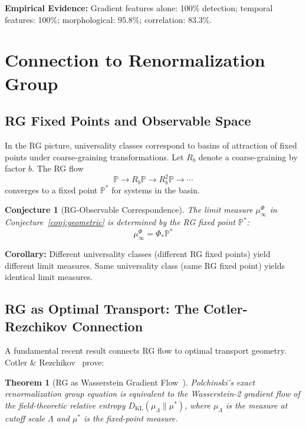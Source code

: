 \documentclass[aps,pre,reprint,amsmath,amssymb,superscriptaddress]{revtex4-2}
\newtheorem{conjecture}{Conjecture}
\newtheorem{theorem}{Theorem}
\newcommand{\bbP}{\mathbb{P}}
\begin{document}
\textbf{Empirical Evidence:} Gradient features alone: 100\% detection; temporal features: 100\%; morphological: 95.8\%; correlation: 83.3\%.

\section{Connection to Renormalization Group}
\label{sec:RG}

\subsection{RG Fixed Points and Observable Space}

In the RG picture, universality classes correspond to basins of attraction of fixed points under coarse-graining transformations. Let $R_b$ denote a coarse-graining by factor $b$. The RG flow
\begin{equation}
\bbP \to R_b \bbP \to R_b^2 \bbP \to \cdots
\end{equation}
converges to a fixed point $\bbP^*$ for systems in the basin.

\begin{conjecture}[RG-Observable Correspondence]
\label{conj:RG}
The limit measure $\mu^\Phi_\infty$ in Conjecture~\ref{conj:geometric} is determined by the RG fixed point $\bbP^*$:
\begin{equation}
\mu^\Phi_\infty = \Phi_* \bbP^*
\end{equation}
\end{conjecture}

\textbf{Corollary:} Different universality classes (different RG fixed points) yield different limit measures. Same universality class (same RG fixed point) yields identical limit measures.

\subsection{RG as Optimal Transport: The Cotler-Rezchikov Connection}

A fundamental recent result connects RG flow to optimal transport geometry. Cotler \& Rezchikov~\cite{CotlerRezchikov2023} prove:

\begin{theorem}[RG as Wasserstein Gradient Flow~\cite{CotlerRezchikov2023}]
Polchinski's exact renormalization group equation is equivalent to the Wasserstein-2 gradient flow of the field-theoretic relative entropy $D_{\text{KL}}(\mu_\Lambda \| \mu^*)$, where $\mu_\Lambda$ is the measure at cutoff scale $\Lambda$ and $\mu^*$ is the fixed-point measure.
\end{theorem}
\end{document}
